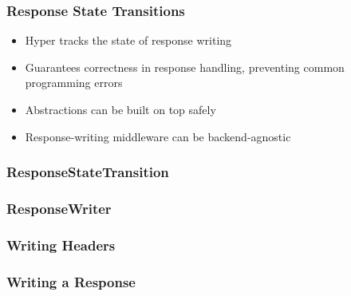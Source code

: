 \begin{frame}
  \frametitle{Response State Transitions}
  \begin{itemize}
    \pause
    \item<+-> Hyper tracks the state of response writing
    \item<+-> Guarantees correctness in response handling, preventing common programming errors
    \item<+-> Abstractions can be built on top safely
    \item<+-> Response-writing middleware can be backend-agnostic
  \end{itemize}
\end{frame}


\begin{frame}
  \frametitle{ResponseStateTransition}
  
\end{frame}

\begin{frame}[fragile]
  \frametitle{ResponseWriter}
  
\end{frame}

\begin{frame}
  \frametitle{Writing Headers}
  
\end{frame}

\begin{frame}
  \frametitle{Writing a Response}
  
\end{frame}

